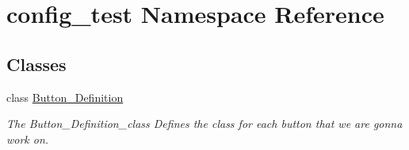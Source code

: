 \hypertarget{a00025}{}\section{config\+\_\+test Namespace Reference}
\label{a00025}
\subsection*{Classes}
\begin{DoxyCompactItemize}
\item 
class \hyperlink{a00053}{Button\+\_\+\+Definition}
\begin{DoxyCompactList}\small\item\em The Button\+\_\+\+Definition\+\_\+class Defines the class for each button that we are gonna work on. \end{DoxyCompactList}\end{DoxyCompactItemize}
